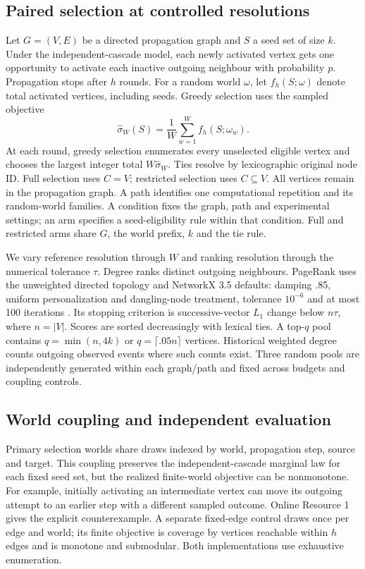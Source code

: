 \documentclass[smallextended]{svjour3}
\begin{document}
\subsection{Paired selection at controlled resolutions}
Let $G=(V,E)$ be a directed propagation graph and $S$ a seed set of size $k$. Under the independent-cascade model, each newly activated vertex gets one opportunity to activate each inactive outgoing neighbour with probability $p$. Propagation stops after $h$ rounds. For a random world $\omega$, let $f_h(S;\omega)$ denote total activated vertices, including seeds. Greedy selection uses the sampled objective
\begin{equation}
\widehat\sigma_W(S)=\frac{1}{W}\sum_{w=1}^{W}f_h(S;\omega_w).
\end{equation}
At each round, greedy selection enumerates every unselected eligible vertex and chooses the largest integer total $W\widehat\sigma_W$. Ties resolve by lexicographic original node ID. Full selection uses $C=V$; restricted selection uses $C\subseteq V$. All vertices remain in the propagation graph. A path identifies one computational repetition and its random-world families. A condition fixes the graph, path and experimental settings; an arm specifies a seed-eligibility rule within that condition. Full and restricted arms share $G$, the world prefix, $k$ and the tie rule.

We vary reference resolution through $W$ and ranking resolution through the numerical tolerance $\tau$. Degree ranks distinct outgoing neighbours. PageRank uses the unweighted directed topology and NetworkX 3.5 defaults: damping .85, uniform personalization and dangling-node treatment, tolerance $10^{-6}$ and at most 100 iterations \cite{networkxpr}. Its stopping criterion is successive-vector $L_1$ change below $n\tau$, where $n=|V|$. Scores are sorted decreasingly with lexical ties. A top-$q$ pool contains $q=\min(n,4k)$ or $q=\lceil .05n\rceil$ vertices. Historical weighted degree counts outgoing observed events where such counts exist. Three random pools are independently generated within each graph/path and fixed across budgets and coupling controls.

\subsection{World coupling and independent evaluation}\label{sec:coupling}
Primary selection worlds share draws indexed by world, propagation step, source and target. This coupling preserves the independent-cascade marginal law for each fixed seed set, but the realized finite-world objective can be nonmonotone. For example, initially activating an intermediate vertex can move its outgoing attempt to an earlier step with a different sampled outcome. Online Resource 1 gives the explicit counterexample. A separate fixed-edge control draws once per edge and world; its finite objective is coverage by vertices reachable within $h$ edges and is monotone and submodular. Both implementations use exhaustive enumeration.
\end{document}

